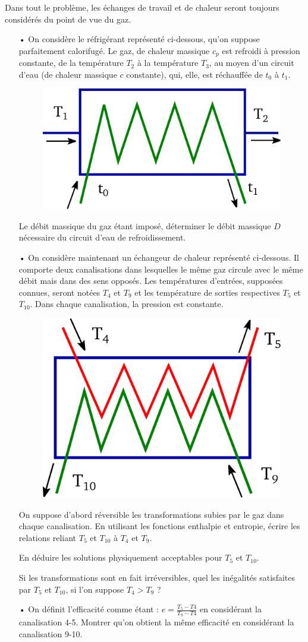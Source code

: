 \documentclass{report}
\begin{document}
Dans tout le problème, les échanges de travail et de chaleur seront toujours considérés du point de vue du gaz.
\begin{itemize}

\item[•] On considère le réfrigérant représenté ci-dessous, qu'on suppose parfaitement calorifugé. Le gaz, de chaleur massique $c_{p}$ est refroidi à pression constante, de la température $T_{2}$ à la température $T_{3}$, au moyen d'un circuit d'eau (de chaleur massique $c$ constante), qui, elle, est réchauffée de $t_{0}$ à $t_{1}$.

\begin{figure}[!h]
\centering
\includegraphics[width=0.3\linewidth]{refrigirant.pdf}
\end{figure}

Le débit massique du gaz étant imposé, déterminer le débit massique $D$ nécessaire du circuit d'eau de refroidissement.
\item[•] On considère maintenant un échangeur de chaleur représenté ci-dessous. Il comporte deux canalisations dans lesquelles le même gaz circule avec le même débit mais dans des sens opposés. Les températures d'entrées, supposées connues, seront notées $T_{4}$ et $T_{9}$ et les température de sorties respectives $T_{5}$ et $T_{10}$. Dans chaque canalisation, la pression est constante.
\begin{figure}[!h]
\centering
\includegraphics[width=0.3\linewidth]{echangeur.pdf}
\end{figure}
On suppose d'abord réversible les transformations subies par le gaz dans chaque canalisation. En utilisant les fonctions enthalpie et entropie, écrire les relations reliant $T_{5}$ et $T_{10}$ à $T_{4}$ et $T_{9}$.

En déduire les solutions physiquement acceptables pour $T_{5}$ et $T_{10}$.

Si les transformations sont en fait irréversibles, quel les inégalités satisfaites par $T_{5}$ et $T_{10}$, si l'on suppose $T_{4}>T_{9}$ ?

\item[•] On définit l'efficacité comme étant : $e=\frac{T_{5}-T{4}}{T_{9}-T{4}}$ en considérant la canalisation 4-5. Montrer qu'on obtient la même efficacité en considérant la canalisation 9-10.
\end{itemize}
\end{document}
